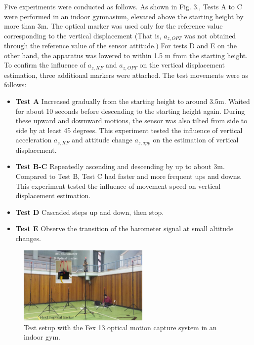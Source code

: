 \documentclass[10pt,journal,compsoc]{IEEEtran}
\begin{document}
Five experiments were conducted as follows. As shown in Fig. 3., Tests A to C 
were performed in an indoor gymnasium, elevated above the
starting height by more than 3m. The optical marker was used only for the
reference value corresponding to the vertical displacement (That is, $a_{z,OPT}$
was not obtained through the reference value of the sensor attitude.) 
For tests D and E on the other hand, the apparatus was lowered to within 1.5 m from the starting height.
To confirm the influence of $a_{z,KF}$ and $a_{z,OPT}$ on the vertical displacement
estimation, three additional markers were attached.  The test movements were as follows:
\begin{itemize}
    \item \textbf{Test A} Increased gradually from the starting height to around 3.5m.
         Waited for about 10 seconds before descending to the starting height again.
         During these upward and downward motions, the sensor was also tilted from side to side
         by at least 45 degrees.  This experiment tested the influence of vertical
         acceleration $a_{z,KF}$ and attitude change $a_{z,app}$ on the estimation of
         vertical displacement.
    \item \textbf{Test B-C} Repeatedly ascending and descending by up to about 3m. Compared to Test B, 
        Test C had faster and more frequent ups and downs. This experiment
        tested the influence of movement speed on vertical displacement estimation.
    \item \textbf{Test D} Cascaded steps up and down, then stop.
    \item \textbf{Test E} Observe the transition of the barometer signal at small altitude changes.
\end{itemize}

\begin{figure}[!t]
\centering
\includegraphics[width=2.5in]{fig3}
\caption{Test setup with the Fex 13 optical motion capture system in an indoor gym.}
\label{fig3}
\end{figure}
\end{document}
